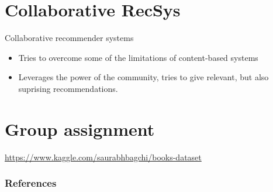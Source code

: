 \documentclass[compress]{beamer}
\begin{document}
\section{Collaborative  RecSys}
\begin{frame}
	\begin{block}{Collaborative recommender systems}
		\begin{itemize}
			\item <1-> Tries to overcome some of the limitations of content-based systems
			\item <2->Leverages the power of the community, tries to give relevant, but also suprising recommendations. 
		\end{itemize}
	\end{block}
\end{frame}

\section{Group assignment}
\url{https://www.kaggle.com/saurabhbagchi/books-dataset}


\begin{frame}
	\frametitle{References}
	\printbibliography
\end{frame}
	
\end{document}
